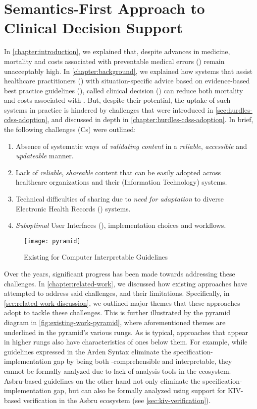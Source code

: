 \chapter{Semantics-First Approach to Clinical Decision Support}\label{chapter:semantics-first-cdss}

In \autoref{chapter:introduction}, we explained that, despite
advances in medicine, mortality and costs associated with preventable
medical errors (\PMEs{}) remain unacceptably high. In
\autoref{chapter:background}, we explained how systems that
assist healthcare practitioners (\HCPs{}) with situation-specific
advice based on evidence-based best practice guidelines (\BPGs{}),
called clinical decision (\CDSSs{}) can reduce both mortality
and costs associated with \PMEs{}. But, despite their potential,
the uptake of such systems in practice is hindered by challenges
that were introduced in \autoref{sec:hurdles-cdss-adoption}, and
discussed in depth in \autoref{chapter:hurdles-cdss-adoption}.
In brief, the following challenges (Cs) were outlined:
\begin{enumerate}[label=C\arabic*.]
\itemsep0.0em
\item Absence of systematic ways of \emph{validating content}
in a \emph{reliable}, \emph{accessible} and \emph{updateable} manner.
\item Lack of \emph{reliable}, \emph{shareable} \CDSS{} content
that can be easily adopted across healthcare organizations and their (Information
Technology) \IT{} systems.
\item Technical difficulties of sharing due to \emph{need for
  adaptation} to diverse Electronic Health Records (\EHR) systems.
\item \emph{Suboptimal} User Interfaces (\UIs), implementation choices and
workflows.
\end{enumerate}

\begin{figure}[th!]
  \centering
  \texttt{[image: pyramid]}
  \caption{Existing \DSLs{} for Computer Interpretable Guidelines}\label{fig:existing-work-pyramid}
\end{figure}

Over the years, significant progress has been made towards
addressing these challenges. In \autoref{chapter:related-work},
we discussed how existing approaches have attempted to
address said challenges, and their limitations. Specifically,
in \autoref{sec:related-work-discussion}, we outlined major
themes that these approaches adopt to tackle these challenges.
This is further illustrated by the pyramid diagram in \autoref{fig:existing-work-pyramid}, where aforementioned themes are
underlined in the pyramid's various rungs.
As is typical, approaches that appear in higher rungs also
have characteristics of ones below them. For example, while guidelines expressed in
the Arden Syntax eliminate the specification-implementation gap by being
both \HCP{}-comprehensible and interpretable, they cannot be formally analyzed
due to lack of analysis tools in the ecosystem. Asbru-based guidelines
on the other hand not only eliminate the specification-implementation gap, but can also be
formally analyzed using support for KIV-based verification in the Asbru
ecosystem (see \autoref{sec:kiv-verification}).

